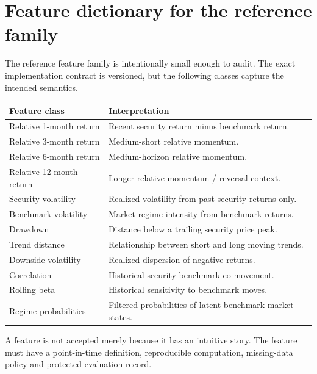 \documentclass[11pt]{article}
\begin{document}
\section{Feature dictionary for the reference family}
The reference feature family is intentionally small enough to audit. The exact implementation contract is versioned, but the following classes capture the intended semantics.
\begin{longtable}{p{}p{}}
\toprule
Feature class & Interpretation\\
\midrule
\endhead
Relative 1-month return & Recent security return minus benchmark return.\\
Relative 3-month return & Medium-short relative momentum.\\
Relative 6-month return & Medium-horizon relative momentum.\\
Relative 12-month return & Longer relative momentum / reversal context.\\
Security volatility & Realized volatility from past security returns only.\\
Benchmark volatility & Market-regime intensity from benchmark returns.\\
Drawdown & Distance below a trailing security price peak.\\
Trend distance & Relationship between short and long moving trends.\\
Downside volatility & Realized dispersion of negative returns.\\
Correlation & Historical security-benchmark co-movement.\\
Rolling beta & Historical sensitivity to benchmark moves.\\
Regime probabilities & Filtered probabilities of latent benchmark market states.\\
\bottomrule
\end{longtable}

A feature is not accepted merely because it has an intuitive story. The feature must have a point-in-time definition, reproducible computation, missing-data policy and protected evaluation record.
\end{document}
